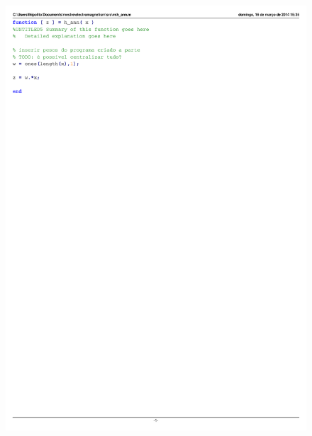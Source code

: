 \documentclass{IEEEtran}
\begin{document}
\begin{figure}
	\centering
	\includegraphics{h_ann.pdf}
	\label{h_ann}
\end{figure}
\end{document}
